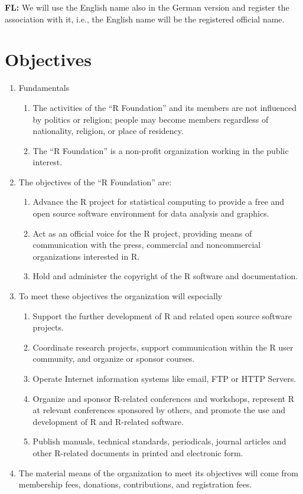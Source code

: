 \documentclass[a4paper]{article}
\newcommand{\note}[2]{{\it \par\noindent\textbf{#1:} #2}}
\begin{document}
\note{FL}{We will use the English name also in the German version and
  register the association with it, i.e., the English name will be the
  registered official name.}

\section{Objectives}

\begin{enumerate}
 \item Fundamentals
  \begin{enumerate}
   \item The activities of the ``R Foundation'' and its members are not
    influenced by politics or religion; people may become members
    regardless of nationality, religion, or place of residency.
   \item The ``R Foundation'' is a non-profit organization working in
    the public interest.
  \end{enumerate}
 \item The objectives of the ``R Foundation'' are:
  \begin{enumerate}
   \item Advance the R project for statistical computing to provide a
    free and open source software environment for data analysis and
    graphics. 
   \item Act as an official voice for the R project, providing means of
    communication with the press, commercial and noncommercial
    organizations interested in R.
   \item Hold and administer the copyright of the R software and
    documentation.
  \end{enumerate}

 \item To meet these objectives the organization will especially
  \begin{enumerate}
   \item Support the further development of R and related open source
    software projects.
   \item Coordinate research projects, support communication within
    the R user community, and organize or sponsor courses.
   \item Operate Internet information systems like email, FTP or HTTP
    Servers.
   \item Organize and sponsor R-related conferences and workshops,
    represent R at relevant conferences sponsored by others, and
    promote the use and development of R and R-related software.
   \item Publish manuals, technical standards, periodicals, journal
    articles and other R-related documents in printed and electronic
    form.
  \end{enumerate}

 \item The material means of the organization to meet its objectives will
  come from membership fees, donations, contributions, and
  registration fees.
\end{enumerate}
\end{document}

